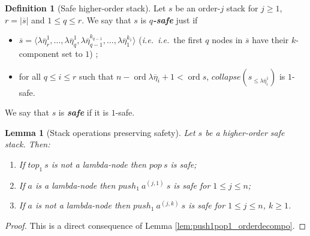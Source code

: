 \documentclass{article}
\newcommand{\ord}{\mathop{\mathrm{ord}}}
\newcommand{\prefixof}{\leqslant}
\newcommand\defname[1]{{\bf\em #1}\index{#1}}
\newtheorem{lemma}{Lemma}[section]
\theoremstyle{remark}
\theoremstyle{definition}
\newtheorem{definition}{Definition}[section]
\newcommand\orddec\overline
\begin{document}
\begin{definition}[Safe higher-order stack]
\label{dfn:safestack} Let $s$ be an order-$j$ stack for $j\geq1$, $r
= |\orddec{s}|$ and $1 \leq q \leq r$. We say that $s$ is
\defname{$q$-safe} just if
\begin{itemize}
\item $\orddec{s} = \langle \lambda \overline{\eta}_r^1, \ldots ,
\lambda \overline{\eta}_q^1, \lambda
\overline{\eta}_{q-1}^{k_{q-1}}, \ldots , \lambda
\overline{\eta}_1^{k_1} \rangle$ ({\it i.e.}~{\it i.e.}~the
first $q$ nodes in $\orddec{s}$ have their $k$-component set
to $1$) ;
\item for all $q \leq i \leq r$ such that $n-\ord{\lambda \overline{\eta}_i}+1 <
\ord{s}$, $collapse (s_{\prefixof \lambda \overline{\eta}_i^1})$ is $1$-safe.
\end{itemize}
We say that $s$ is \defname{safe} if it is $1$-safe.
\end{definition}


\begin{lemma}[Stack operations preserving safety]
\label{lem:push1pop1_preserves_safety} Let $s$ be a higher-order
safe stack. Then:
\begin{enumerate}
  \item If $top_1\ s$ is not a lambda-node then $pop\ s$ is safe;
  \item If $a$ is a lambda-node then $push_1\ a^{(j,1)}\ s$ is safe for $1 \leq j \leq n$;
  \item If $a$ is not a lambda-node then $push_1\ a^{(j,k)}\ s$
is safe for $1 \leq j \leq n$, $k \geq 1$.
\end{enumerate}
\end{lemma}
\begin{proof}
This is a direct consequence of Lemma
\ref{lem:push1pop1_orderdecompo}.
\end{proof}
\end{document}
